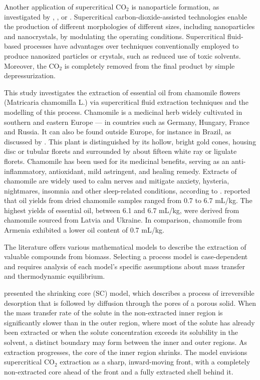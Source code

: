 \documentclass[a4paper,fleqn]{cas-dc}
\begin{document}
	Another application of supercritical CO$_2$ is nanoparticle formation, as investigated by \citet{Padrela2018}, \citet{Franco2021}, \citet{SaadatiArdestani2020} or \citet{Sodeifian2022}. Supercritical carbon-dioxide-assisted technologies enable the production of different morphologies of different sizes, including nanoparticles and nanocrystals, by modulating the operating conditions. Supercritical fluid-based processes have advantages over techniques conventionally employed to produce nanosized particles or crystals, such as reduced use of toxic solvents. Moreover, the CO$_2$ is completely removed from the final product by simple depressurization.
	
	This study investigates the extraction of essential oil from chamomile flowers (Matricaria chamomilla L.) via supercritical fluid extraction techniques and the modelling of this process. Chamomile is a medicinal herb widely cultivated in southern and eastern Europe — in countries such as Germany, Hungary, France and Russia. It can also be found outside Europe, for instance in Brazil, as discussed by \citet{Singh2011}. This plant is distinguished by its hollow, bright gold cones, housing disc or tubular florets and surrounded by about fifteen white ray or ligulate florets. Chamomile has been used for its medicinal benefits, serving as an anti-inflammatory, antioxidant, mild astringent, and healing remedy. Extracts of chamomile are widely used to calm nerves and mitigate anxiety, hysteria, nightmares, insomnia and other sleep-related conditions, according to \citet{Srivastava2009}. \citet{Orav2010} reported that oil yields from dried chamomile samples ranged from 0.7 to 6.7 mL/kg. The highest yields of essential oil, between 6.1 and 6.7 mL/kg, were derived from chamomile sourced from Latvia and Ukraine. In comparison, chamomile from Armenia exhibited a lower oil content of 0.7 mL/kg.
	
	The literature offers various mathematical models to describe the extraction of valuable compounds from biomass. Selecting a process model is case-dependent and requires analysis of each model's specific assumptions about mass transfer and thermodynamic equilibrium.
	
	\citet{Goto1996} presented the shrinking core (SC) model, which describes a process of irreversible desorption that is followed by diffusion through the pores of a porous solid. When the mass transfer rate of the solute in the non-extracted inner region is significantly slower than in the outer region, where most of the solute has already been extracted or when the solute concentration exceeds its solubility in the solvent, a distinct boundary may form between the inner and outer regions. As extraction progresses, the core of the inner region shrinks. The model envisions supercritical CO$_2$ extraction as a sharp, inward-moving front, with a completely non-extracted core ahead of the front and a fully extracted shell behind it.
	
\end{document}
